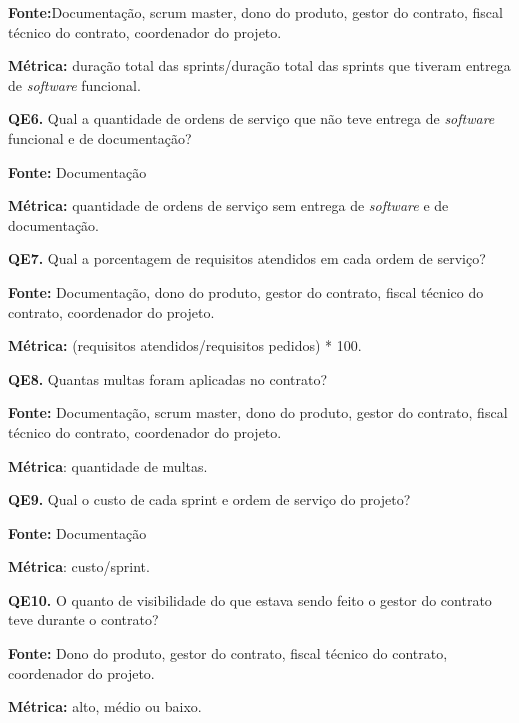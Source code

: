 \textbf{Fonte:}Documentação, scrum master, dono do produto, gestor do contrato, fiscal técnico do contrato, coordenador do projeto.

\textbf{Métrica:} duração total das sprints/duração total das sprints que tiveram entrega de \textit{software} funcional.

 \vspace{\onelineskip} 

\textbf{QE6.} Qual a quantidade de ordens de serviço que não teve entrega de \textit{software} funcional e de documentação?

\textbf{Fonte:} Documentação

\textbf{Métrica:} quantidade de ordens de serviço sem entrega de \textit{software} e de documentação.

 \vspace{\onelineskip} 
 
\textbf{QE7.} Qual a porcentagem de requisitos atendidos em cada ordem de serviço?

\textbf{Fonte:} Documentação, dono do produto, gestor do contrato, fiscal técnico do contrato, coordenador do projeto.

\textbf{Métrica:} (requisitos atendidos/requisitos pedidos) * 100.
 
 \vspace{\onelineskip} 

\textbf{QE8.} Quantas multas foram aplicadas no contrato?

\textbf{Fonte:} Documentação, scrum master, dono do produto, gestor do contrato, fiscal técnico do contrato, coordenador do projeto.

\textbf{Métrica}: quantidade de multas.

 \vspace{\onelineskip}  

\textbf{QE9.} Qual o custo de cada sprint e ordem de serviço do projeto?

\textbf{Fonte:} Documentação

\textbf{Métrica}: custo/sprint.

 \vspace{\onelineskip}  

\textbf{QE10.} O quanto de visibilidade do que estava sendo feito o gestor do contrato teve durante o contrato?

\textbf{Fonte:} Dono do produto, gestor do contrato, fiscal técnico do contrato, coordenador do projeto.

\textbf{Métrica:} alto, médio ou baixo. 
 
